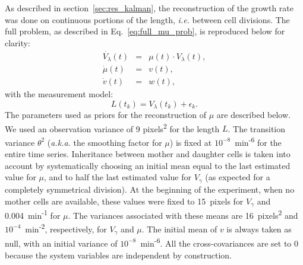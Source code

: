 As described in section~\ref{sec:res_kalman}, the reconstruction
of the growth rate was done on continuous portions of the length,
\textit{i.e.} between cell divisions. The full problem, as described
in Eq.~\ref{eq:full_mu_prob}, is reproduced below for clarity: 
\begin{eqnarray*}
\dot{V_{\lambda}}(t) & = & \mu(t)\cdot V_{\lambda}(t),\\
\dot{\mu}(t) & = & v(t),\\
\dot{v}(t) & = & w(t),
\end{eqnarray*}
with the measurement model: 
\[
L(t_{k})=V_{\lambda}(t_{k})+\epsilon_{k}.
\]
The parameters used as priors for the reconstruction of $\mu$ are
described below. We used an observation variance of 9 pixels\textsuperscript{2}
for the length $L$. The transition variance $\theta^{2}$ (\textit{a.k.a.}
the smoothing factor for $\mu$) is fixed at $10^{-8}$~min\textsuperscript{-6}
for the entire time series. Inheritance between mother and daughter
cells is taken into account by systematically choosing an initial
mean equal to the last estimated value for $\mu$, and to half the
last estimated value for $V_{\gamma}$ (as expected for a completely
symmetrical division). At the beginning of the experiment, when no
mother cells are available, these values were fixed to 15~pixels
for $V_{\gamma}$ and 0.004~min\textsuperscript{-1} for $\mu$.
The variances associated with these means are 16~pixels\textsuperscript{2}
and $10^{-4}$~min\textsuperscript{-2}, respectively, for $V_{\gamma}$
and $\mu$. The initial mean of $v$ is always taken as null, with
an initial variance of $10^{-8}$~min\textsuperscript{-6}. All the
cross-covariances are set to 0 because the system variables are independent
by construction.

